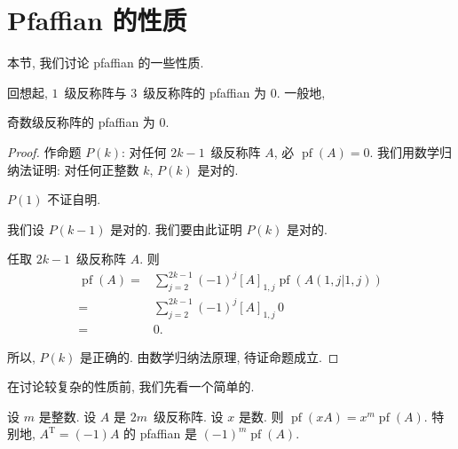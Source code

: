 \section{Pfaffian 的性质}

本节, 我们讨论 pfaffian 的一些性质.

回想起, \(1\)~级反称阵与 \(3\)~级反称阵的 pfaffian 为 \(0\).
一般地,

\begin{theorem}
    奇数级反称阵的 pfaffian 为 \(0\).
\end{theorem}

\begin{proof}
    作命题 \(P(k)\):
    对任何 \(2k-1\)~级反称阵 \(A\),
    必 \(\operatorname{pf} {(A)} = 0\).
    我们用数学归纳法证明:
    对任何正整数 \(k\), \(P(k)\) 是对的.

    \(P(1)\) 不证自明.

    我们设 \(P(k-1)\) 是对的.
    我们要由此证明 \(P(k)\) 是对的.

    任取 \(2k-1\)~级反称阵 \(A\).
    则
    \begin{align*}
        \operatorname{pf} {(A)}
        = {} &
        \sum_{j = 2}^{2k-1}
        {(-1)^{j} [A]_{1,j}
        \operatorname{pf} {(A({1,j}|{1,j}))}}
        \\
        = {} &
        \sum_{j = 2}^{2k-1}
        {(-1)^{j} [A]_{1,j}\, 0}
        \\
        = {} &
        0.
    \end{align*}

    所以, \(P(k)\) 是正确的.
    由数学归纳法原理, 待证命题成立.
\end{proof}

在讨论较复杂的性质前, 我们先看一个简单的.

\begin{theorem}
    设 \(m\) 是整数.
    设 \(A\) 是 \(2m\)~级反称阵.
    设 \(x\) 是数.
    则 \(\operatorname{pf} {(xA)}
    = x^m \operatorname{pf} {(A)}\).
    特别地, \(A^{\mathrm{T}} = (-1)A\) 的 pfaffian
    是 \((-1)^m \operatorname{pf} {(A)}\).
\end{theorem}

